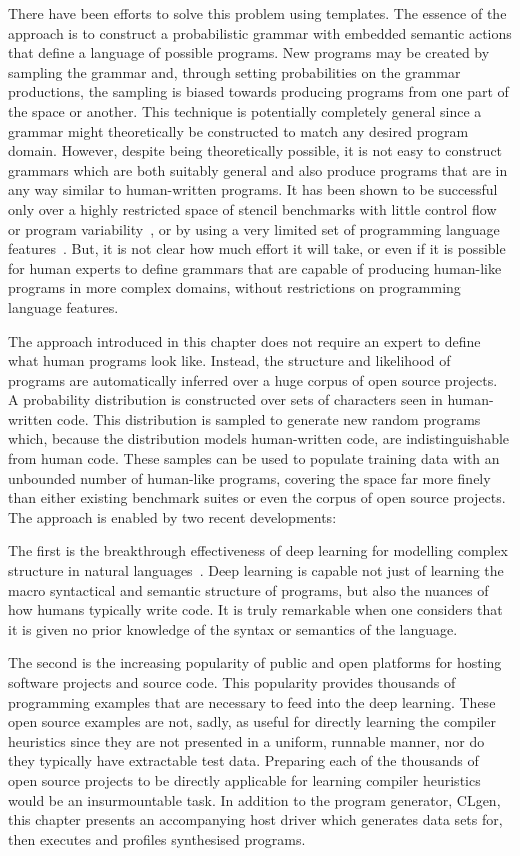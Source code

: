 There have been efforts to solve this problem using templates. The essence of the approach is to construct a probabilistic grammar with embedded semantic actions that define a language of possible programs. New programs may be created by sampling the grammar and, through setting probabilities on the grammar productions, the sampling is biased towards producing programs from one part of the space or another. This technique is potentially completely general since a grammar might theoretically be constructed to match any desired program domain. However, despite being theoretically possible, it is not easy to construct grammars which are both suitably general and also produce programs that are in any way similar to human-written programs. It has been shown to be successful only over a highly restricted space of stencil benchmarks with little control flow or program variability~\cite{Falch2015,Cummins2016a}, or by using a very limited set of programming language features~\cite{Kosta2019}. But, it is not clear how much effort it will take, or even if it is possible for human experts to define grammars that are capable of producing human-like programs in more complex domains, without restrictions on programming language features.

The approach introduced in this chapter does not require an expert to define what human programs look like. Instead, the structure and likelihood of programs are automatically inferred over a huge corpus of open source projects. A probability distribution is constructed over sets of characters seen in human-written code. This distribution is sampled to generate new random programs which, because the distribution models human-written code, are indistinguishable from human code. These samples can be used to populate training data with an unbounded number of human-like programs, covering the space far more finely than either existing benchmark suites or even the corpus of open source projects. The approach is enabled by two recent developments:

The first is the breakthrough effectiveness of deep learning for modelling complex structure in natural languages~\cite{Graves2013,Sutskever2014}. Deep learning is capable not just of learning the macro syntactical and semantic structure of programs, but also the nuances of how humans typically write code. It is truly remarkable when one considers that it is given no prior knowledge of the syntax or semantics of the language.

The second is the increasing popularity of public and open platforms for hosting software projects and source code. This popularity provides thousands of programming examples that are necessary to feed into the deep learning. These open source examples are not, sadly, as useful for directly learning the compiler heuristics since they are not presented in a uniform, runnable manner, nor do they typically have extractable test data. Preparing each of the thousands of open source projects to be directly applicable for learning compiler heuristics would be an insurmountable task. In addition to the program generator, CLgen, this chapter presents an accompanying host driver which generates data sets for, then executes and profiles synthesised programs.


